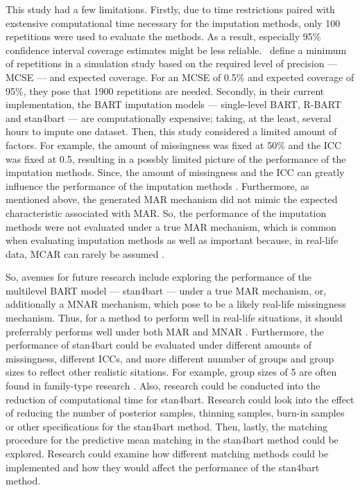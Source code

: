 \documentclass[3p,12pt,a4paper]{elsarticle}
\begin{document}
This study had a few limitations. Firstly, due to time restrictions paired with exstensive computational time necessary for the imputation methods, only 100 repetitions were used to evaluate the methods. As a result, especially 95\% confidence interval coverage estimates might be less reliable.~\citet{morris2019} define a minimum of repetitions in a simulation study based on the required level of precision --- MCSE --- and expected coverage. For an  MCSE of 0.5\% and expected coverage of 95\%, they pose that 1900 repetitions are needed. Secondly, in their current implementation, the BART imputation models --- single-level BART, R-BART and stan4bart --- are computationally expensive; taking, at the least, several hours to impute one dataset. Then, this study considered a limited amount of factors. For example, the amount of missingness was fixed at 50\% and the ICC was fixed at 0.5, resulting in a possbly limited picture of the performance of the imputation methods. Since, the amount of missingness and the ICC can greatly influence the performance of the imputation methods \citep{enders2018,enders2018a,enders2020,mistler2017,akkayahocagil2023,grund2016,grund2018a,grund2018,ludtke2017,grund2021}. Furthermore, as mentioned above, the generated MAR mechanism did not mimic the expected characteristic associated with MAR. So, the performance of the imputation methods were not evaluated under a true MAR mechanism, which is common when evaluating imputation methods \citep{buurenFlexibleImputationMissing2018,enders2018a,peeters2015,austin2021,carpenter2013,little2002,grund2018,ludtke2017,grund2021,schouten2021} as well as important because, in real-life data, MCAR can rarely be assumed \citep{oberman2023,buurenFlexibleImputationMissing2018,kang2013,little2002}.

So, avenues for future research include exploring the performance of the multilevel BART model --- stan4bart --- under a true MAR mechanism, or, additionally a MNAR mechanism, which \citet{oberman2023} pose to be a likely real-life missingness mechanism. Thus, for a method to perform well in real-life situations, it should preferrably performs well under both MAR and MNAR \citep{oberman2023}. Furthermore, the performance of stan4bart could be evaluated under different amounts of missingness, different ICCs, and more different nunmber of groups and group sizes to reflect other realistic sitations. For example, group sizes of 5 are often found in family-type research \citep{maas2005}. Also, research could be conducted into the reduction of computational time for stan4bart. Research could look into the effect of reducing the number of posterior samples, thinning samples, burn-in samples or other specifications for the stan4bart method. Then, lastly, the matching procedure for the predictive mean matching in the stan4bart method could be explored. Research could examine how different matching methods \citep{buurenFlexibleImputationMissing2018} could be implemented and how they would affect the performance of the stan4bart method.
\end{document}
